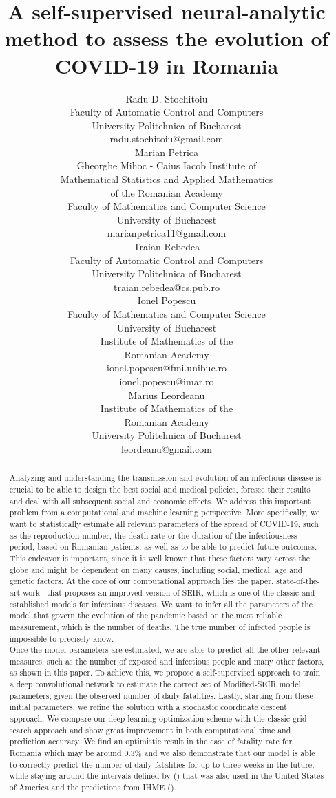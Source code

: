 \documentclass[11pt]{article}
\title{A self-supervised neural-analytic method to assess the evolution of COVID-19 in Romania}
\author{
  Radu D. Stochitoiu \\
  {\small Faculty of Automatic Control and Computers}\\
  {\small University Politehnica of Bucharest} \\
  {\small radu.stochitoiu@gmail.com} \\
   \And
   Marian Petrica \\
   {\small Gheorghe Mihoc - Caius Iacob Institute of}\\
   {\small Mathematical Statistics and Applied Mathematics}\\
   {\small of the Romanian Academy}\\
   {\small Faculty of Mathematics and Computer Science}\\
   {\small University of Bucharest}\\
   {\small marianpetrica11@gmail.com} \\
   \And
   Traian Rebedea \\
   {\small Faculty of Automatic Control and Computers}\\
   {\small University Politehnica of Bucharest}\\
   {\small traian.rebedea@cs.pub.ro} \\
   \And
   Ionel Popescu \\
   {\small Faculty of Mathematics and Computer Science}\\
   {\small University of Bucharest} \\
   {\small Institute of Mathematics of the} \\
   {\small Romanian Academy} \\
   {\small ionel.popescu@fmi.unibuc.ro} \\
   {\small ionel.popescu@imar.ro} \\
   \And
   Marius Leordeanu \\
   {\small Institute of Mathematics of the} \\
   {\small Romanian Academy} \\
   {\small University Politehnica of Bucharest} \\
   {\small leordeanu@gmail.com} \\
}
\begin{document}
\maketitle

\begin{abstract}
  Analyzing and understanding the transmission and evolution of an infectious disease is crucial to be able to design the best social and medical policies, foresee their results and deal with all subsequent social and economic effects. We address this important problem from a computational and machine learning perspective. More specifically, we want to statistically estimate all relevant parameters of the spread of COVID-19, such as the reproduction number, the death rate or the duration of the infectiousness period, based on Romanian patients, as well as to be able to predict future outcomes. This endeavor is important, since it is well known that these factors vary across the globe and might be dependent on many causes, including social, medical, age and genetic factors. At the core of our computational approach lies the paper, state-of-the-art work~\cite{chowdhury2020dynamic} that proposes an improved version of SEIR, which is one of the classic and established models for infectious diseases. We want to infer all the parameters of the model that govern the evolution of the pandemic based on the most reliable measurement, which is the number of deaths. The true number of infected people is impossible to precisely know.\\
  Once the model parameters are estimated, we are able to predict all the other relevant measures, such as the number of exposed and infectious people and many other factors, as shown in this paper. To achieve this, we propose a self-supervised approach to train a deep convolutional network to estimate the correct set of Modified-SEIR model parameters, given the observed number of daily fatalities. Lastly, starting from these initial parameters, we refine the solution with a stochastic coordinate descent approach. We compare our deep learning optimization scheme with the classic grid search approach and show great improvement in both computational time and prediction accuracy. We find an optimistic result in the case of fatality rate for Romania which may be around 0.3\% and we also demonstrate that our model is able to correctly predict the number of daily fatalities for up to three weeks in the future, while staying around the intervals defined by (\cite{Youyanggu}) that was also used in the United States of America and the predictions from IHME (\cite{2020.04.21.20074732}).
\end{abstract}
\end{document}
